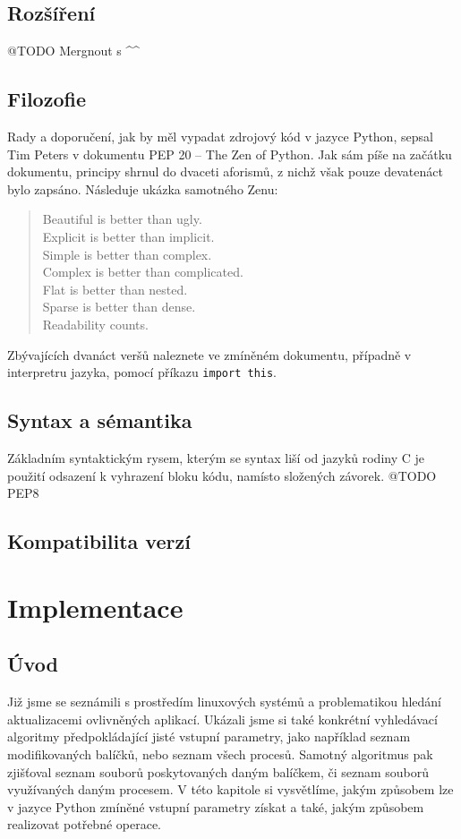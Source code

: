\documentclass[10pt,a4paper]{article}
\begin{document}
		\subsection{Rozšíření}
		@TODO Mergnout s \textasciicircum\textasciicircum

		\subsection{Filozofie}
		Rady a doporučení, jak by měl vypadat zdrojový kód v jazyce Python, sepsal Tim Peters v dokumentu PEP 20 -- The Zen of Python. Jak sám píše na začátku dokumentu, principy shrnul do dvaceti aforismů, z nichž však pouze devatenáct bylo zapsáno. Následuje ukázka samotného Zenu:

		\begin{verse}
		Beautiful is better than ugly.\\
		Explicit is better than implicit.\\
		Simple is better than complex.\\
		Complex is better than complicated.\\
		Flat is better than nested.\\
		Sparse is better than dense.\\
		Readability counts.\\
		\end{verse}

		Zbývajících dvanáct veršů naleznete ve zmíněném dokumentu, případně v interpretru jazyka, pomocí příkazu \texttt{import this}.

		\subsection{Syntax a sémantika}
		Základním syntaktickým rysem, kterým se syntax liší od jazyků rodiny C je použití odsazení k vyhrazení bloku kódu, namísto složených závorek.
		@TODO PEP8


		\subsection{Kompatibilita verzí}

	\section{Implementace}
		\subsection{Úvod}
		Již jsme se seznámili s prostředím linuxových systémů a problematikou hledání aktualizacemi ovlivněných aplikací. Ukázali jsme si také konkrétní vyhledávací algoritmy předpokládající jisté vstupní parametry, jako například seznam modifikovaných balíčků, nebo seznam všech procesů. Samotný algoritmus pak zjišťoval seznam souborů poskytovaných daným balíčkem, či seznam souborů využívaných daným procesem. V této kapitole si vysvětlíme, jakým způsobem lze v jazyce Python zmíněné vstupní parametry získat a také, jakým způsobem realizovat potřebné operace.
\end{document}
